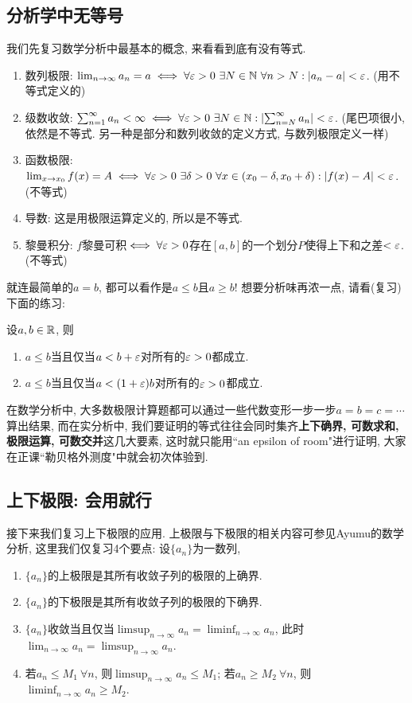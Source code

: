 \subsection{分析学中无等号}
我们先复习数学分析中最基本的概念, 来看看到底有没有等式.
\begin{enumerate}
    \item 数列极限: $\lim_{n \to \infty}a_n = a \iff \forall \varepsilon>0~\exists N \in \mathbb{N}~\forall n > N: |a_n-a| < \varepsilon$. (用不等式定义的)
    \item 级数收敛: $\sum_{n=1}^{\infty} a_n < \infty \iff \forall \varepsilon>0~\exists N \in \mathbb{N}: \abs{\sum_{n=N}^{\infty}a_n} < \varepsilon$. (尾巴项很小, 依然是不等式. 另一种是部分和数列收敛的定义方式, 与数列极限定义一样)
    \item 函数极限: $\lim_{x \to x_0} f(x) = A \iff \forall \varepsilon>0~\exists \delta>0~\forall x \in (x_0 - \delta, x_0 + \delta): |f(x) - A|<\varepsilon$. (不等式)
    \item 导数: 这是用极限运算定义的, 所以是不等式.
    \item 黎曼积分: $f$黎曼可积$\iff \forall \varepsilon > 0$存在$[a,b]$的一个划分$P$使得上下和之差$<\varepsilon$. (不等式)  
\end{enumerate}
就连最简单的$a=b$, 都可以看作是$a\leq b$且$a \geq b$! 想要分析味再浓一点, 请看(复习)下面的练习:
\begin{exercise}
    设$a,b \in \mathbb{R}$, 则
    \begin{enumerate}
    \item $a \leq b$当且仅当$a<b+\varepsilon$对所有的$\varepsilon>0$都成立. 
    \item $a \leq b$当且仅当$a<(1+\varepsilon)b$对所有的$\varepsilon>0$都成立. 
    \end{enumerate}
\end{exercise}
在数学分析中, 大多数极限计算题都可以通过一些代数变形一步一步$a=b=c=\cdots$算出结果, 
而在实分析中, 我们要证明的等式往往会同时集齐\textbf{上下确界, 可数求和, 极限运算, 可数交并}这几大要素, 这时就只能用``an epsilon of room"进行证明, 大家在正课``勒贝格外测度"中就会初次体验到.

\subsection{上下极限: 会用就行}
接下来我们复习上下极限的应用. 上极限与下极限的相关内容可参见Ayumu的数学分析, 这里我们仅复习4个要点: 设$\{a_n\}$为一数列,
\begin{enumerate}
    \item $\{a_n\}$的上极限是其所有收敛子列的极限的上确界.
    \item $\{a_n\}$的下极限是其所有收敛子列的极限的下确界.
    \item $\{a_n\}$收敛当且仅当$\limsup_{n\to \infty} a_n = \liminf_{n\to \infty} a_n$, 此时$\lim_{n \to \infty} a_n = \limsup_{n\to \infty} a_n$.
    \item 若$a_n \leq M_1~\forall n$, 则$\limsup_{n\to \infty} a_n \leq M_1$;
          若$a_n \geq M_2~\forall n$, 则$\liminf_{n\to \infty} a_n \geq M_2$.
\end{enumerate}

